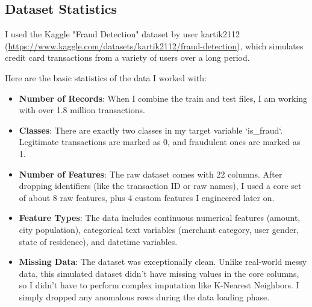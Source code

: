 \documentclass[11pt]{article}
\begin{document}
\subsection{Dataset Statistics}
I used the Kaggle "Fraud Detection" dataset by user kartik2112 (\url{https://www.kaggle.com/datasets/kartik2112/fraud-detection}), which simulates credit card transactions from a variety of users over a long period. 

Here are the basic statistics of the data I worked with:
\begin{itemize}
    \item \textbf{Number of Records}: When I combine the train and test files, I am working with over 1.8 million transactions. 
    \item \textbf{Classes}: There are exactly two classes in my target variable `is\_fraud`. Legitimate transactions are marked as 0, and fraudulent ones are marked as 1.
    \item \textbf{Number of Features}: The raw dataset comes with 22 columns. After dropping identifiers (like the transaction ID or raw names), I used a core set of about 8 raw features, plus 4 custom features I engineered later on.
    \item \textbf{Feature Types}: The data includes continuous numerical features (amount, city population), categorical text variables (merchant category, user gender, state of residence), and datetime variables.
    \item \textbf{Missing Data}: The dataset was exceptionally clean. Unlike real-world messy data, this simulated dataset didn't have missing values in the core columns, so I didn't have to perform complex imputation like K-Nearest Neighbors. I simply dropped any anomalous rows during the data loading phase.
\end{itemize}
\end{document}
